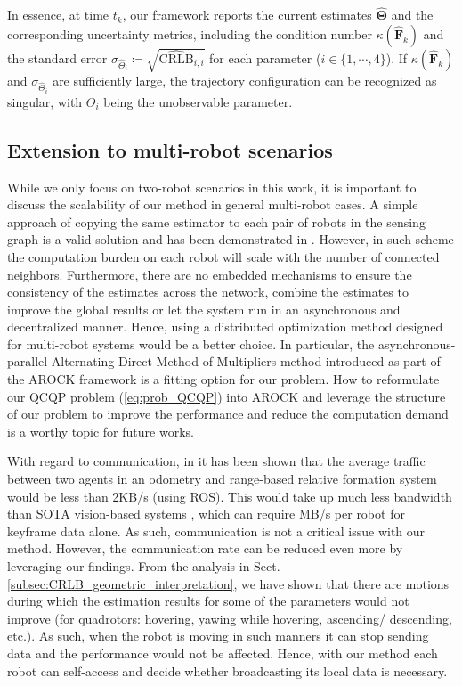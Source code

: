 \documentclass[journal]{IEEEtran}
\def\StateVector{\mathbf{\Theta}}
\def\FIM{\mathbf{F}}
\begin{document}
In essence, at time $t_k$, our framework reports the current estimates $\hat{\StateVector}$ and the corresponding uncertainty metrics, including the condition number $\kappa(\hat{\FIM}_k)$ and the standard error $\sigma_{\hat{\Theta}_i} \coloneqq \sqrt{\hat{\textrm{CRLB}}_{i,i}}$ for each parameter ($i \in \{1,\cdots,4\}$). If $\kappa(\hat{\FIM}_k)$ and $\sigma_{\hat{\Theta}_i}$ are sufficiently large, the trajectory configuration can be recognized as singular, with $\Theta_i$ being the unobservable parameter.

\subsection{Extension to multi-robot scenarios} \label{subsec:general_multi_robot}

{\color{black}
While we only focus on two-robot scenarios in this work, it is important to discuss the scalability of our method in general multi-robot cases. 
A simple approach of copying the same estimator to each pair of robots in the sensing graph is a valid solution and has been demonstrated in \cite{cornejo2015distributed,cossette2021relative}. However, in such scheme the computation burden on each robot will scale with the number of connected neighbors. Furthermore, there are no embedded mechanisms to ensure the consistency of the estimates across the network, combine the estimates to improve the global results or let the system run in an asynchronous and decentralized manner.
Hence, using a distributed optimization method designed for multi-robot systems \cite{halsted2021survey} would be a better choice.
In particular, the asynchronous-parallel Alternating Direct Method of Multipliers method introduced as part of the AROCK framework \cite{peng2016arock} is a fitting option for our problem. How to reformulate our QCQP problem (\ref{eq:prob_QCQP}) into AROCK and leverage the structure of our problem to improve the performance and reduce the computation demand is a worthy topic for future works.

With regard to communication, in \cite{ziegler2021distributed} it has been shown that the average traffic between two agents in an odometry and range-based relative formation system would be less than 2KB/s (using ROS). This would take up much less bandwidth than SOTA vision-based systems \cite{tian2021kimeramulti}, which can require MB/s per robot for keyframe data alone. As such, communication is not a critical issue with our method. However, the communication rate can be reduced even more by leveraging our findings.
From the analysis in Sect. \ref{subsec:CRLB_geometric_interpretation}, we have shown that there are motions during which the estimation results for some of the parameters would not improve (for quadrotors: hovering, yawing while hovering, ascending/ descending, etc.). As such, when the robot is moving in such manners it can stop sending data and the performance would not be affected. Hence, with our method each robot can self-access and decide whether broadcasting its local data is necessary.
}
\end{document}
